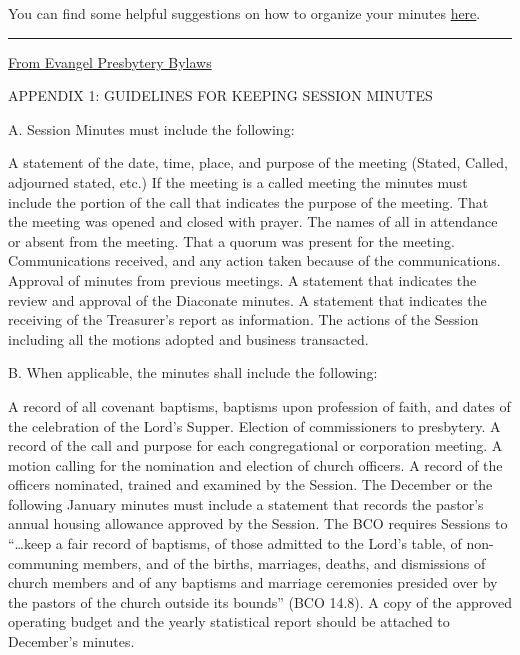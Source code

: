 \documentclass[
]{book}
\begin{document}
You can find some helpful suggestions on how to organize your minutes \href{organization-of-files.html}{here}.

\begin{center}\rule{0.5\linewidth}{0.5pt}\end{center}

\href{https://docs.google.com/document/d/1WZ4PrWPCNPNsUEmfXLPNXCNJz5qaB09T3HXnCkPh2ak/edit?usp=sharing}{From Evangel Presbytery Bylaws}

APPENDIX 1: GUIDELINES FOR KEEPING SESSION MINUTES

A. Session Minutes must include the following:

A statement of the date, time, place, and purpose of the meeting (Stated, Called, adjourned stated, etc.)
If the meeting is a called meeting the minutes must include the portion of the call that indicates the purpose of the meeting.
That the meeting was opened and closed with prayer.
The names of all in attendance or absent from the meeting.
That a quorum was present for the meeting.
Communications received, and any action taken because of the communications.
Approval of minutes from previous meetings.
A statement that indicates the review and approval of the Diaconate minutes.
A statement that indicates the receiving of the Treasurer's report as information.
The actions of the Session including all the motions adopted and business transacted.

B. When applicable, the minutes shall include the following:

A record of all covenant baptisms, baptisms upon profession of faith, and dates of the celebration of the Lord's Supper.
Election of commissioners to presbytery.
A record of the call and purpose for each congregational or corporation meeting.
A motion calling for the nomination and election of church officers.
A record of the officers nominated, trained and examined by the Session.
The December or the following January minutes must include a statement that records the pastor's annual housing allowance approved by the Session.
The BCO requires Sessions to ``\ldots keep a fair record of baptisms, of those admitted to the Lord's table, of non-communing members, and of the births, marriages, deaths, and dismissions of church members and of any baptisms and marriage ceremonies presided over by the pastors of the church outside its bounds'' (BCO 14.8).
A copy of the approved operating budget and the yearly statistical report should be attached to December's minutes.
\end{document}

